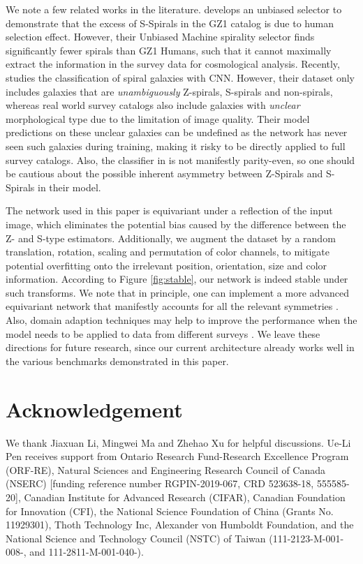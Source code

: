 \documentclass[twocolumn]{aastex631}
\begin{document}
We note a few related works in the literature.
\citet{hayes2017nature} develops an unbiased selector to demonstrate that the excess of S-Spirals in the GZ1 catalog is due to human selection effect.
However, their Unbiased Machine spirality selector finds significantly fewer spirals than GZ1 Humans, such that it cannot maximally extract the information in the survey data for cosmological analysis. 
Recently, \citet{tadaki2020spin} studies the classification of spiral galaxies with CNN.
However, their dataset only includes galaxies that are \textit{unambiguously} Z-spirals, S-spirals and non-spirals, whereas real world survey catalogs also include galaxies with \textit{unclear} morphological type due to the limitation of image quality.
Their model predictions on these unclear galaxies can be undefined as the network has never seen such galaxies during training, making it risky to be directly applied to full survey catalogs.
Also, the classifier in \citet{tadaki2020spin} is not manifestly parity-even, so one should be cautious about the possible inherent asymmetry between Z-Spirals and S-Spirals in their model.

The network used in this paper is equivariant under a reflection of the input image, which eliminates the potential bias caused by the difference between the Z- and S-type estimators.
Additionally, we augment the dataset by a random translation, rotation, scaling and permutation of color channels, to mitigate potential overfitting onto the irrelevant position, orientation, size and color information.
According to Figure \ref{fig:stable}, our network is indeed stable under such transforms.
We note that in principle, one can implement a more advanced equivariant network that manifestly accounts for all the relevant symmetries
\citep[e.g.][]{zhang2019making,weiler2019general,sosnovik2019scale,cesa2022a}.
Also, domain adaption techniques may help to improve the performance when the model needs to be applied to data from different surveys \citep{bendavid2010theory,alexander2021domain}.
We leave these directions for future research, since our current architecture already works well in the various benchmarks demonstrated in this paper.

\section{Acknowledgement}

We thank Jiaxuan Li, Mingwei Ma and Zhehao Xu for helpful discussions.
Ue-Li Pen receives support from Ontario Research Fund-Research Excellence Program (ORF-RE), Natural Sciences and Engineering Research Council of Canada (NSERC) [funding reference number RGPIN-2019-067, CRD 523638-18, 555585-20], Canadian Institute for Advanced Research (CIFAR), Canadian Foundation for Innovation (CFI), the National Science Foundation of China (Grants No. 11929301), Thoth Technology Inc, Alexander von Humboldt Foundation, and the National Science and Technology Council (NSTC) of Taiwan (111-2123-M-001-008-, and 111-2811-M-001-040-).
\end{document}

